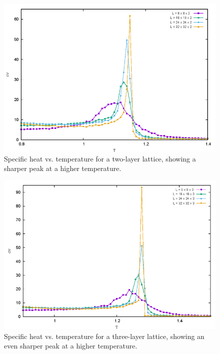\documentclass[conference, compsoc, twoside]{IEEEtran}
\begin{document}
\begin{figure}[ht]
    \centering
    \includegraphics[width=0.9\columnwidth]{Gambar 10. Cv vs T pada Kisi 2 Lapis.png}
    \caption{Specific heat vs. temperature for a two-layer lattice, showing a sharper peak at a higher temperature.}
    \label{fig:cv_two_layer}
\end{figure}

\begin{figure}[ht]
    \centering
    \includegraphics[width=0.9\columnwidth]{Gambar 11. Cv vs T pada Kisi 3 Lapis.png}
    \caption{Specific heat vs. temperature for a three-layer lattice, showing an even sharper peak at a higher temperature.}
    \label{fig:cv_three_layer}
\end{figure}
\end{document}
